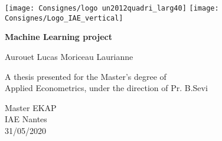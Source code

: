 \begin{titlepage}
\flushleft
\texttt{[image: Consignes/logo un2012quadri\_larg40]}
\hfill
\texttt{[image: Consignes/Logo\_IAE\_vertical]}

   \begin{center}
       \vspace*{1cm}

			 \Large
       \textbf{Machine Learning project}

       \vfill
			
			 \vspace{0.7cm}

			 \normalsize
       Aurouet Lucas Moriceau Laurianne
			
			\vspace{0.5cm}
        
			 \normalsize
       A thesis presented for the Master's degree of\\
       Applied Econometrics, under the direction of Pr. B.Sevi
            
       \vspace{0.7cm}
       
       \normalsize   
       Master EKAP\\
       IAE Nantes\\
       31/05/2020
            
   \end{center}
\end{titlepage}